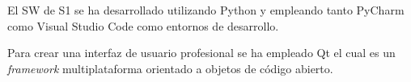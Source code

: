 El \ac{SW} de \ac{S1} se ha desarrollado utilizando Python y empleando tanto PyCharm como Visual Studio Code como entornos de desarrollo. 

 Para crear una interfaz de usuario profesional se ha empleado Qt el cual es un \textit{framework} multiplataforma orientado a objetos de código abierto.